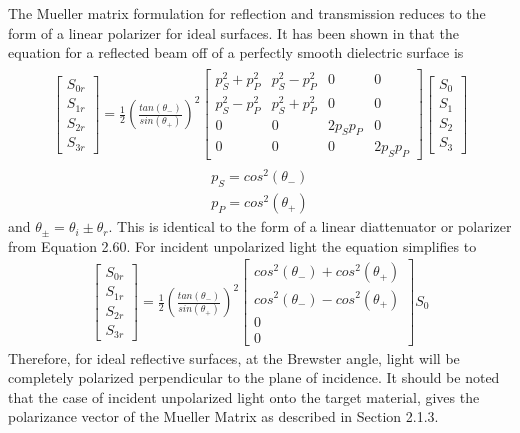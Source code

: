 The Mueller matrix formulation for reflection and transmission reduces to the form of a linear polarizer for ideal surfaces.  It has been shown in \cite{polarizedlight} that the equation for a reflected beam off of a perfectly smooth dielectric surface is
%
\begin{align}
    \begin{split}
    \begin{bmatrix}
        S_{0r} \\
        S_{1r} \\
        S_{2r} \\
        S_{3r}
    \end{bmatrix}
    =
    \frac{1}{2}(\frac{tan(\theta_{-})}{sin(\theta_{+})})^2
    \begin{bmatrix}
       p_S^2 + p_P^2 & p_S^2 - p_P^2 & 0 & 0 \\
        p_S^2 - p_P^2 & p_S^2 + p_P^2 & 0 & 0 \\
        0 & 0 & 2p_Sp_P & 0 \\
        0 & 0 & 0 & 2p_Sp_P
    \end{bmatrix}
    \begin{bmatrix}
        S_0 \\
        S_1 \\
        S_2 \\
        S_3
    \end{bmatrix}
    \end{split}
\end{align}
%
\begin{align}
    p_S = cos^2(\theta_{-}) \\
    p_P = cos^2(\theta_{+})
\end{align}
and $\theta_{\pm}=\theta_i \pm \theta_r$.
This is identical to the form of a linear diattenuator or polarizer from Equation 2.60. For incident unpolarized light the equation simplifies to
%
\begin{align}
    \begin{bmatrix}
        S_{0r} \\
        S_{1r} \\
        S_{2r} \\
        S_{3r}
    \end{bmatrix}
    =
    \frac{1}{2}(\frac{tan(\theta_{-})}{sin(\theta_{+})})^2
    \begin{bmatrix}
        cos^2(\theta_{-}) + cos^2(\theta_{+}) \\
        cos^2(\theta_{-}) - cos^2(\theta_{+}) \\
        0 \\
        0
    \end{bmatrix}
    S_0
\end{align}
%
Therefore, for ideal reflective surfaces, at the Brewster angle, light will be completely polarized perpendicular to the plane of incidence. It should be noted that the case of incident unpolarized light onto the target material, gives the polarizance vector of the Mueller Matrix as described in Section 2.1.3.

